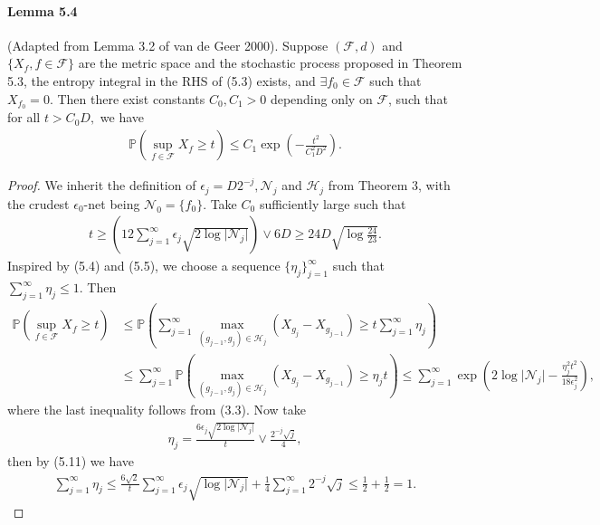 \documentclass{article}
\begin{document}
\paragraph{Lemma 5.4} (Adapted from Lemma 3.2 of van de Geer 2000). Suppose $(\mathcal{F},d)$ and $\{X_f,f\in\mathcal{F}\}$ are the metric space and the stochastic process proposed in Theorem 5.3, the entropy integral in the RHS of (5.3) exists, and $\exists f_0\in\mathcal{F}$ such that $X_{f_0}=0.$ Then there exist constants $C_0,C_1>0$ depending only on $\mathcal{F}$, such that for all
$t > C_0D,$ we have
\begin{align*}
	\mathbb{P}\left(\sup_{f\in\mathcal{F}} X_f \geq t\right) \leq C_1\exp\left(-\frac{t^2}{C_1^2D^2}\right).\tag{5.10}
\end{align*}
\begin{proof}
We inherit the definition of $\epsilon_j=D2^{-j},\mathcal{N}_j$ and $\mathcal{H}_j$ from Theorem 3, with the crudest $\epsilon_0$-net being $\mathcal{N}_0 = \{f_0\}$. Take $C_0$ sufficiently large such that
\begin{align*}
	t\geq \left(12\sum_{j=1}^\infty \epsilon_{j}\sqrt{2\log\vert\mathcal{N}_j\vert}\right)\vee 6D\geq 24D\sqrt{\log\frac{24}{23}}.\tag{5.11}
\end{align*}
Inspired by (5.4) and (5.5), we choose a sequence $\{\eta_j\}_{j=1}^\infty$ such that $\sum_{j=1}^\infty\eta_j \leq 1.$ Then
\begin{align*}
	\mathbb{P}\left(\sup_{f\in\mathcal{F}} X_f\geq t\right)&\leq \mathbb{P}\left(\sum_{j=1}^\infty\max_{(g_{j-1},g_j)\in\mathcal{H}_j}\left(X_{g_j} - X_{g_{j-1}}\right) \geq t\sum_{j=1}^\infty\eta_j\right)\\
	&\leq\sum_{j=1}^\infty\mathbb{P}\left(\max_{(g_{j-1},g_j)\in\mathcal{H}_j}\left(X_{g_j} - X_{g_{j-1}}\right) \geq \eta_jt\right)
	\leq\sum_{j=1}^\infty\exp\left(2\log\vert\mathcal{N}_j\vert - \frac{\eta_j^2t^2}{18\epsilon_{j}^2}\right),\tag{5.12}
\end{align*}
where the last inequality follows from (3.3). Now take
\begin{align*}
	\eta_j = \frac{6\epsilon_{j}\sqrt{2\log\vert\mathcal{N}_j\vert}}{t}\vee\frac{2^{-j}\sqrt{j}}{4},\tag{5.13}
\end{align*}
then by (5.11) we have
\begin{align*}
	\sum_{j=1}^\infty\eta_j \leq \frac{6\sqrt{2}}{t}\sum_{j=1}^\infty\epsilon_{j}\sqrt{\log\vert\mathcal{N}_j\vert} + \frac{1}{4}\sum_{j=1}^\infty 2^{-j}\sqrt{j} \leq \frac{1}{2} + \frac{1}{2} = 1.\tag{5.14}
\end{align*}

\end{proof}
\end{document}

